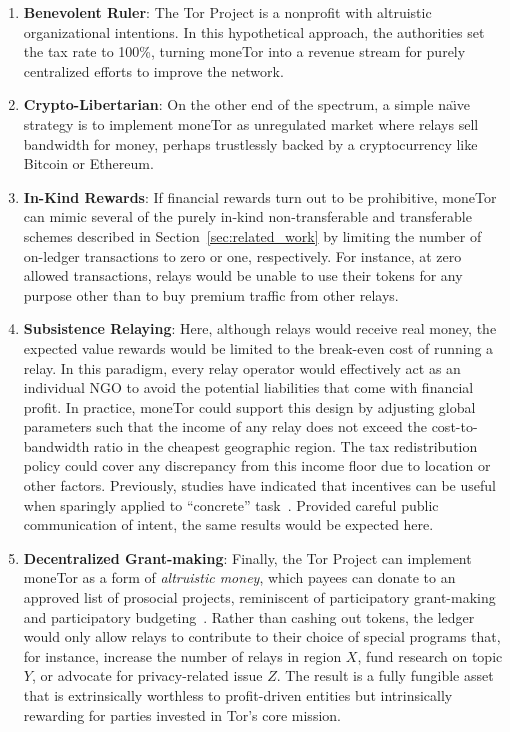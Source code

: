 \begin{enumerate}

\item \textbf{Benevolent Ruler}: The Tor Project is a nonprofit with altruistic organizational intentions.
  In this hypothetical approach, the authorities set the tax rate to 100\%, turning moneTor into a revenue stream for purely centralized efforts to improve the network.

\item \textbf{Crypto-Libertarian}: On the other end of the spectrum, a simple na\"{\i}ve strategy is to implement moneTor as unregulated market where relays sell bandwidth for money, perhaps trustlessly backed by a cryptocurrency like Bitcoin or Ethereum.

\item \textbf{In-Kind Rewards}: If financial rewards turn out to be prohibitive, moneTor can mimic several of the purely in-kind non-transferable and transferable schemes described in Section~\ref{sec:related_work} by limiting the number of on-ledger transactions to zero or one, respectively.
  For instance, at zero allowed transactions, relays would be unable to use their tokens for any purpose other than to buy premium traffic from other relays.

\item \textbf{Subsistence Relaying}: Here, although relays would receive real money, the expected value rewards would be limited to the break-even cost of running a relay.
In this paradigm, every relay operator would effectively act as an individual NGO to avoid the potential liabilities that come with financial profit.
In practice, moneTor could support this design by adjusting global parameters such that the income of any relay does not exceed the cost-to-bandwidth ratio in the cheapest geographic region.
The tax redistribution policy could cover any discrepancy from this income floor due to location or other factors.
Previously, studies have indicated that incentives can be useful when sparingly applied to ``concrete'' task~\cite{10.1257/jep.25.4.191, 10.1086/431263}.
Provided careful public communication of intent, the same results would be expected here.

\item \textbf{Decentralized Grant-making}: Finally, the Tor Project can implement moneTor as a form of \emph{altruistic money}, which payees can donate to an approved list of prosocial projects, reminiscent of participatory grant-making and participatory budgeting~\cite{dinh2020universal}.
Rather than cashing out tokens, the ledger would only allow relays to contribute to their choice of special programs that, for instance, increase the number of relays in region $X$, fund research on topic $Y$, or advocate for privacy-related issue $Z$.
The result is a fully fungible asset that is extrinsically worthless to profit-driven entities but intrinsically rewarding for parties invested in Tor's core mission.

\end{enumerate}

